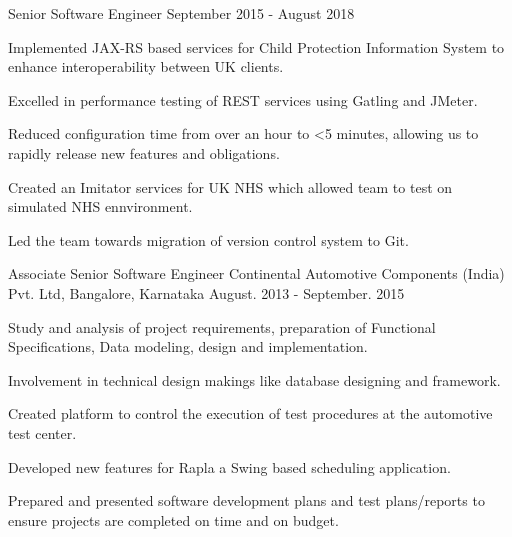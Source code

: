 \begin{cventries}
    \begin{cventries}
        \cventry
          {Senior Software Engineer}
          {}
          {}
          {September 2015 - August 2018}
          {
            \begin{cvitems}
              \item {Implemented JAX-RS based services for Child Protection Information System to enhance interoperability between UK clients.}
              \item {Excelled in performance testing of REST services using Gatling and JMeter.}
              \item {Reduced configuration time from over an hour to <5 minutes, allowing us to rapidly release new features and obligations.}
              \item {Created an Imitator services for UK NHS which allowed team to test on simulated NHS ennvironment.}
              \item {Led the team towards migration of version control system to Git.}
            \end{cvitems}
          }
    \end{cventries}

  \cventry
    {Associate Senior Software Engineer} %
    {Continental Automotive Components (India) Pvt. Ltd,} %
    {Bangalore, Karnataka} %
    {August. 2013 - September. 2015} %
    {
      \begin{cvitems} %
        \item {Study and analysis of project requirements, preparation of Functional Specifications, Data modeling, design and implementation.}
        \item {Involvement in technical design makings like database designing and framework.}
        \item {Created platform to control the execution of test procedures at the automotive test center.}
        \item {Developed new features for Rapla a Swing based scheduling application.}
        \item {Prepared and presented software development plans and test plans/reports to ensure projects are completed on time and on budget.}
      \end{cvitems}
    }


\end{cventries}

